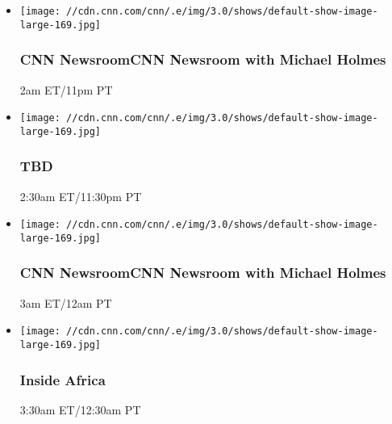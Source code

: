 \begin{itemize}
\item
  \texttt{[image: //cdn.cnn.com/cnn/.e/img/3.0/shows/default-show-image-large-169.jpg]}

  \hypertarget{cnn-newsroomcnn-newsroom-with-michael-holmes--4}{%
  \subsubsection{CNN NewsroomCNN Newsroom with Michael Holmes
  }\label{cnn-newsroomcnn-newsroom-with-michael-holmes--4}}

  2am ET/11pm PT
\end{itemize}

\begin{itemize}
\item
  \texttt{[image: //cdn.cnn.com/cnn/.e/img/3.0/shows/default-show-image-large-169.jpg]}

  \hypertarget{tbd-8}{%
  \subsubsection{TBD}\label{tbd-8}}

  2:30am ET/11:30pm PT
\end{itemize}

\begin{itemize}
\item
  \texttt{[image: //cdn.cnn.com/cnn/.e/img/3.0/shows/default-show-image-large-169.jpg]}

  \hypertarget{cnn-newsroomcnn-newsroom-with-michael-holmes--5}{%
  \subsubsection{CNN NewsroomCNN Newsroom with Michael Holmes
  }\label{cnn-newsroomcnn-newsroom-with-michael-holmes--5}}

  3am ET/12am PT
\end{itemize}

\begin{itemize}
\item
  \texttt{[image: //cdn.cnn.com/cnn/.e/img/3.0/shows/default-show-image-large-169.jpg]}

  \hypertarget{inside-africa-8}{%
  \subsubsection{Inside Africa}\label{inside-africa-8}}

  3:30am ET/12:30am PT
\end{itemize}

